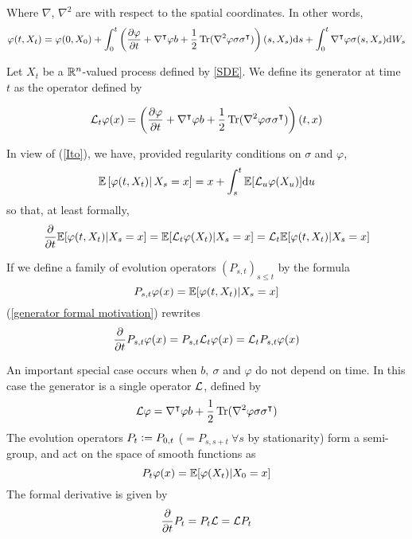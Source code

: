 Where $\nabla$, $\nabla^2$ are with respect to the spatial coordinates. In other words,\\


\begin{equation}
    \label{Ito}
    \varphi(t,X_t)= \varphi(0,X_0)+\int_0^t\left( \frac{\partial \varphi}{\partial t} + \nabla^\intercal\varphi b + \frac12 \operatorname{Tr}(\nabla^2\varphi\sigma\sigma^\intercal) \right)(s,X_s) \text ds + \int_0^t\nabla^\intercal \varphi\sigma(s,X_s)\text dW_s
\end{equation}

    \begin{definition}
        Let $X_t$ be a $\mathbb{R}^n$-valued process defined by \ref{SDE}. We define its generator at time $t$ as the operator defined by

        \begin{equation}
            \label{Generator}
            \mathcal{L}_t \varphi(x)=\left(\frac{\partial \varphi}{\partial t} + \nabla^\intercal\varphi b + \frac12 \operatorname{Tr}(\nabla^2\varphi \sigma\sigma^\intercal)\right)(t,x)
        \end{equation}

    \end{definition}

    In view of (\ref{Ito}), we have, provided regularity conditions on $\sigma$ and $\varphi$,
    $$\mathbb{E}\left[\varphi(t,X_t)\right|X_s=x]=x+\int_s^t \mathbb{E}[\mathcal{L}_u\varphi(X_u)] \text du$$
    so that, at least formally,
    \begin{equation}
    \label{generator formal motivation}
    \frac{\partial}{\partial t}\mathbb{E}[\varphi(t,X_t) | X_{s}=x]=\mathbb{E}[\mathcal{L}_{t} \varphi(X_{t})|X_{s}=x]=\mathcal{L}_{t}\mathbb{E}[\varphi(t,X_{t})|X_{s}=x]
    \end{equation}

    If we define a family of evolution operators $(P_{s,t})_{s\leq t}$ by the formula
    $$P_{s,t} \varphi (x)= \mathbb{E}[ \varphi (t,X_t) | X_s=x] $$
    (\ref{generator formal motivation}) rewrites
    $$ \frac{\partial}{\partial t} P_{s,t} \varphi (x)=P_{s,t}\mathcal{L}_t\varphi(x)=\mathcal{L}_t P_{s,t}\varphi(x)$$
    
    An important special case occurs when $b,\ \sigma$ and $\varphi$ do not depend on time. In this case the generator is a single operator $\mathcal{L}$, defined by
    $$\mathcal{L} \varphi = \nabla^\intercal \varphi b + \frac12 \operatorname{Tr}(\nabla^2 \varphi \sigma \sigma ^\intercal)$$ 
    The evolution operators $P_t \mathrel{\mathop:}= P_{0,t}$ ($ = P_{s,s+t}\ \forall s$ by stationarity) form a semi-group, and act on the space of smooth functions as
    $$ P_t \varphi(x)= \mathbb{E}[\varphi(X_t)| X_0=x]$$
    The formal derivative is given by
    $$ \frac{\partial}{\partial t}P_t=P_t\mathcal{L}=\mathcal{L} P_t$$
    
